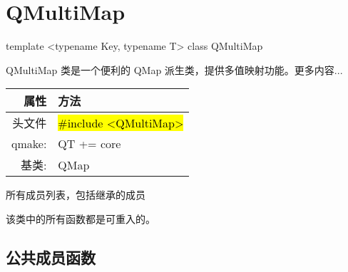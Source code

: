 \chapter{QMultiMap}

template <typename Key, typename T> class QMultiMap

QMultiMap 类是一个便利的 QMap 派生类，提供多值映射功能。更多内容...

\begin{tabular}{|r|l|}
	\hline
	属性 & 方法 \\
	\hline
    头文件  &	\hl{\#include <QMultiMap>} \\
    \hline
    qmake: & QT += core    \\
    \hline
    基类: & QMap    \\
	\hline
\end{tabular}

\begin{compactitem}[\arr]
\item 所有成员列表，包括继承的成员
\end{compactitem}

\begin{notice}
该类中的所有函数都是可重入的。
\end{notice}


\section{公共成员函数}


